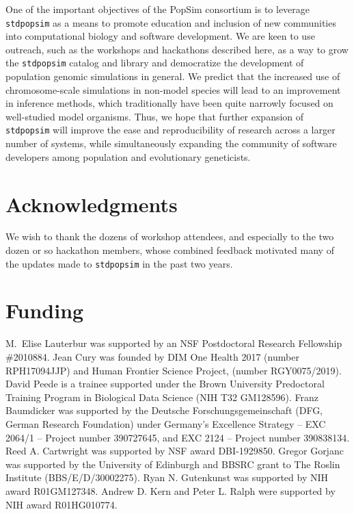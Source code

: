 \documentclass[hidelinks]{article}
\newcommand{\stdpopsim}{\texttt{stdpopsim}\xspace}
\begin{document}
One of the important objectives of the PopSim consortium is to leverage \stdpopsim as a means to promote education and inclusion of new communities into
computational biology and software development.
We are keen to use outreach, such as the workshops and hackathons described here, 
as a way to grow the \stdpopsim catalog and library and
democratize the development of population genomic simulations in general.
We predict that the increased use of chromosome-scale simulations in non-model species will lead to an improvement in inference methods,
which traditionally have been quite narrowly focused on well-studied model organisms.
Thus, we hope that further expansion of \stdpopsim will improve the ease and reproducibility of research across a larger number of systems,
while simultaneously expanding the community of software developers among population and evolutionary geneticists.


\section*{Acknowledgments}\label{acknowledgements}

We wish to thank the dozens of workshop attendees,
and especially to the two dozen or so hackathon members,
whose combined feedback motivated many of the updates made to \stdpopsim in the past two years.

\section*{Funding}
    \label{funding}

M.~Elise Lauterbur was supported by an NSF Postdoctoral Research Fellowship \#2010884.
Jean Cury was founded by DIM One Health 2017 (number RPH17094JJP) and Human Frontier Science Project, (number RGY0075/2019).
David Peede is a trainee supported under the Brown University Predoctoral Training Program in Biological Data Science (NIH T32 GM128596).
Franz Baumdicker was supported by the Deutsche Forschungsgemeinschaft (DFG, German Research Foundation) under Germany’s Excellence Strategy – EXC 2064/1 – Project number 390727645, and EXC 2124 – Project number 390838134.
Reed A. Cartwright was supported by NSF award DBI-1929850.
Gregor Gorjanc was supported by the University of Edinburgh and BBSRC grant to The Roslin Institute (BBS/E/D/30002275).
Ryan N. Gutenkunst was supported by NIH award R01GM127348.
Andrew D. Kern and Peter L. Ralph were supported by NIH award R01HG010774.


\end{document}
